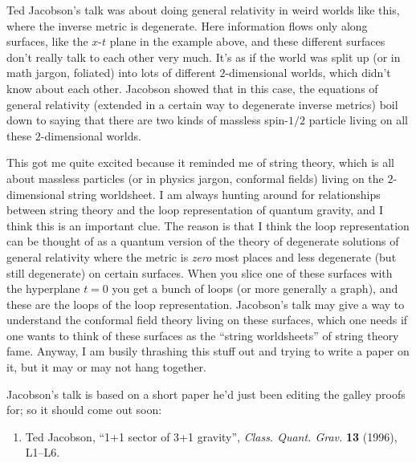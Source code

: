 \documentclass{article}
\def\tightlist{}
\begin{document}
\begin{itemize}
  Ted Jacobson's talk was about doing general relativity in weird worlds
  like this, where the inverse metric is degenerate. Here information
  flows only along surfaces, like the \(x\)-\(t\) plane in the example
  above, and these different surfaces don't really talk to each other
  very much. It's as if the world was split up (or in math jargon,
  foliated) into lots of different \(2\)-dimensional worlds, which
  didn't know about each other. Jacobson showed that in this case, the
  equations of general relativity (extended in a certain way to
  degenerate inverse metrics) boil down to saying that there are two
  kinds of massless spin-\(1/2\) particle living on all these
  \(2\)-dimensional worlds.

  This got me quite excited because it reminded me of string theory,
  which is all about massless particles (or in physics jargon, conformal
  fields) living on the \(2\)-dimensional string worldsheet. I am always
  hunting around for relationships between string theory and the loop
  representation of quantum gravity, and I think this is an important
  clue. The reason is that I think the loop representation can be
  thought of as a quantum version of the theory of degenerate solutions
  of general relativity where the metric is \emph{zero} most places and
  less degenerate (but still degenerate) on certain surfaces. When you
  slice one of these surfaces with the hyperplane \(t = 0\) you get a
  bunch of loops (or more generally a graph), and these are the loops of
  the loop representation. Jacobson's talk may give a way to understand
  the conformal field theory living on these surfaces, which one needs
  if one wants to think of these surfaces as the ``string worldsheets''
  of string theory fame. Anyway, I am busily thrashing this stuff out
  and trying to write a paper on it, but it may or may not hang
  together.

  Jacobson's talk is based on a short paper he'd just been editing the
  galley proofs for; so it should come out soon:

  \begin{enumerate}
  \def\labelenumi{\arabic{enumi})}
  \setcounter{enumi}{1}
  \tightlist
  \item
    Ted Jacobson, ``1+1 sector of 3+1 gravity'', \emph{Class. Quant.
    Grav.} \textbf{13} (1996), L1--L6.
  \end{enumerate}


\end{itemize}
\end{document}

